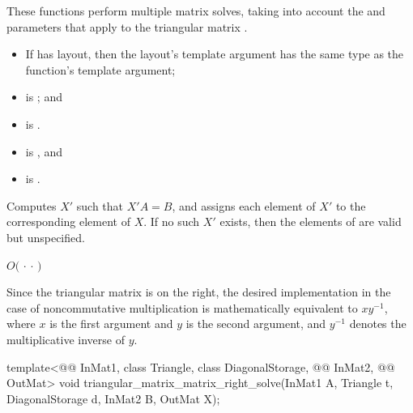 \begin{itemdescr}

\pnum
These functions perform multiple matrix solves,
taking into account the  and  parameters
that apply to the triangular matrix .

\pnum
\mandates
\begin{itemize}
\item
If  has  layout,
then the layout's  template argument has
the same type as the function's  template argument;
\item
{} is ; and
\item
{} is .
\end{itemize}

\pnum
\expects
\begin{itemize}
\item
{} is , and
\item
{} is .
\end{itemize}

\pnum
\effects
Computes $X'$ such that $X'A = B$,
and assigns each element of $X'$ to the corresponding element of $X$.
If no such $X'$ exists,
then the elements of  are valid but unspecified.

\pnum
\complexity
$O($  $\cdot$  $\cdot$  $)$
\begin{note}
Since the triangular matrix is on the right,
the desired  implementation
in the case of noncommutative multiplication
is mathematically equivalent to $x y^{-1}$,
where $x$ is the first argument and $y$ is the second argument,
and $y^{-1}$ denotes the multiplicative inverse of $y$.
\end{note}
\end{itemdescr}

\begin{itemdecl}
template<@@ InMat1, class Triangle, class DiagonalStorage,
         @@ InMat2, @@ OutMat>
  void triangular_matrix_matrix_right_solve(InMat1 A, Triangle t, DiagonalStorage d,
                                            InMat2 B, OutMat X);
\end{itemdecl}

